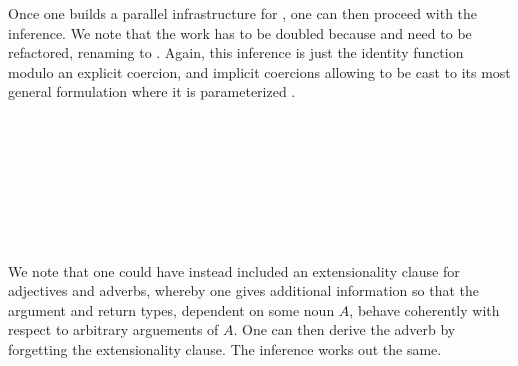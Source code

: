 Once one builds a parallel infrastructure for , one can then
proceed with the inference. We note that the work has to be doubled because
 and 
need to be refactored, renaming  to . Again,
this inference is just the identity function modulo an explicit 
coercion, and implicit coercions allowing  to be cast to
its most general formulation where it is parameterized .

\begin{code}[hide]%
\>[0]\AgdaSpace{}%
\AgdaSymbol{:}\AgdaSpace{}%
\AgdaSpace{}%
\AgdaSpace{}%
\<%
\\
\>[0]\AgdaSpace{}%
\AgdaSpace{}%
\AgdaSymbol{=}\AgdaSpace{}%
\AgdaSpace{}%
\AgdaSpace{}%
\AgdaSpace{}%
\AgdaOperator{\AgdaFunction{\$}}\AgdaSpace{}%
\<%
\\
%
\\[\AgdaEmptyExtraSkip]%
\>[0]\AgdaSpace{}%
\AgdaSymbol{:}\AgdaSpace{}%
\<%
\\
\>[0]\AgdaSpace{}%
\AgdaSymbol{=}\AgdaSpace{}%
\AgdaSpace{}%
\AgdaSpace{}%
\<%
\end{code}
\begin{code}%
\>[0]\AgdaSpace{}%
\AgdaSymbol{:}\<%
\\
\>[0][@{}l@{\AgdaIndent{0}}]%
\>[2]\AgdaSpace{}%
\AgdaSpace{}%
\<%
\\
\>[0]\AgdaSpace{}%
\AgdaSymbol{(}\AgdaSpace{}%
\AgdaOperator{\AgdaInductiveConstructor{,}}\AgdaSpace{}%
\AgdaSymbol{)}\AgdaSpace{}%
\AgdaSymbol{=}\AgdaSpace{}%
\AgdaSymbol{(}\AgdaSpace{}%
\AgdaSymbol{)}\AgdaSpace{}%
\AgdaOperator{\AgdaInductiveConstructor{,}}\AgdaSpace{}%
\<%
\end{code}

We note that one could have instead included an extensionality clause for
adjectives and adverbs, whereby one gives additional information so that the
argument and return types, dependent on some noun $A$, behave coherently with
respect to arbitrary arguements of $A$. One can then derive the adverb by
forgetting the extensionality clause. The inference works out the same.

